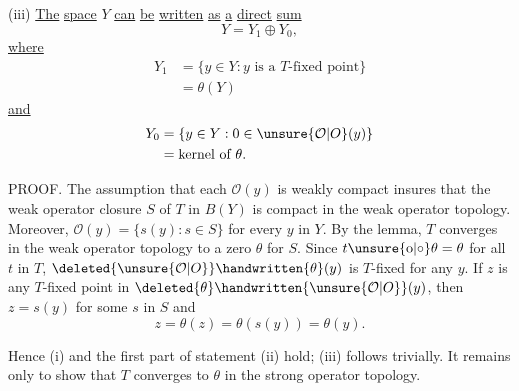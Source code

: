 
(iii) \uline{The} \uline{space} $Y$ \uline{can} \uline{be} \uline{written} \uline{as} \uline{a} \uline{direct} \uline{sum}
\[
Y=Y_1\oplus Y_0,
\]
\uline{where}
\[
\begin{aligned}
Y_1&=\{y\in Y:y\text{ is a }T\text{-fixed point}\}\\
&=\theta(Y)
\end{aligned}
\]
\uline{and}
\[
\begin{aligned}
Y_0&=\{y\in Y:0\in\unsure{\mathcal{O}|O}(y)\}\\
&=\text{kernel of }\theta.
\end{aligned}
\]

PROOF. The assumption that each $\mathcal{O}(y)$ is weakly compact insures that the weak operator closure $S$ of $T$ in $B(Y)$ is compact in the weak operator topology. Moreover, $\mathcal{O}(y)=\{s(y):s\in S\}$ for every $y$ in $Y$. By the lemma, $T$ converges in the weak operator topology to a zero $\theta$ for $S$. Since $t\unsure{\mathbin{\mathrm{o}}|\circ}\theta=\theta$ for all $t$ in $T$, $\deleted{\unsure{\mathcal{O}|O}}\handwritten{\theta}(y)$ is $T$-fixed for any $y$. If $z$ is any $T$-fixed point in $\deleted{\theta}\handwritten{\unsure{\mathcal{O}|O}}(y)$, then $z=s(y)$ for some $s$ in $S$ and
\[
z=\theta(z)=\theta(s(y))=\theta(y).
\]
\unsure{;|,}

Hence (i) and the first part of statement (ii) hold; (iii) follows trivially. It remains only to show that $T$ converges to $\theta$ in the strong operator topology.
